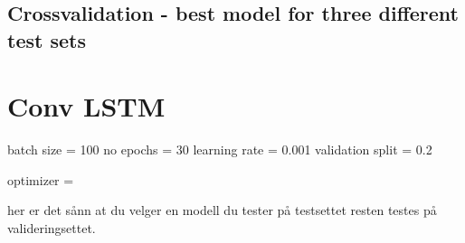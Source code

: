 \subsection{Crossvalidation - best model for three different test sets}


\section{Conv LSTM}

batch size = 100
no epochs = 30
learning rate = 0.001
validation split = 0.2

optimizer = 


her er det sånn at du velger en modell du tester på testsettet resten testes på valideringsettet.


